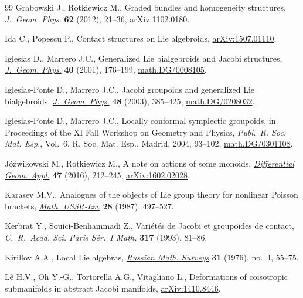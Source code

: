 \begin{thebibliography}{99}
Grabowski J., Rotkiewicz M., Graded bundles and homogeneity structures,
 \href{https://doi.org/10.1016/j.geomphys.2011.09.004}{\textit{J.~Geom. Phys.}} \textbf{62} (2012), 21--36, \href{https://arxiv.org/abs/1102.0180}{arXiv:1102.0180}.

Ida C., Popescu P., Contact structures on Lie algebroids, \href{https://arxiv.org/abs/1507.01110}{arXiv:1507.01110}.

Iglesias D., Marrero J.C., Generalized {L}ie bialgebroids and {J}acobi
 structures, \href{https://doi.org/10.1016/S0393-0440(01)00032-8}{\textit{J.~Geom. Phys.}} \textbf{40} (2001), 176--199,
 \href{https://arxiv.org/abs/math.DG/0008105}{math.DG/0008105}.

Iglesias-Ponte D., Marrero J.C., Jacobi groupoids and generalized {L}ie
 bialgebroids, \href{https://doi.org/10.1016/S0393-0440(03)00050-0}{\textit{J.~Geom. Phys.}} \textbf{48} (2003), 385--425,
 \href{https://arxiv.org/abs/math.DG/0208032}{math.DG/0208032}.

Iglesias-Ponte D., Marrero J.C., Locally conformal symplectic groupoids, in
 Proceedings of the {XI} {F}all {W}orkshop on {G}eometry and {P}hysics,
 \textit{Publ.~R. Soc. Mat. Esp.}, Vol.~6, R. Soc. Mat. Esp., Madrid, 2004,
 93--102, \href{https://arxiv.org/abs/math.DG/0301108}{math.DG/0301108}.

J\'o\'zwikowski M., Rotkiewicz M., A note on actions of some monoids,
 \href{https://doi.org/10.1016/j.difgeo.2016.04.003}{\textit{Differential Geom. Appl.}} \textbf{47} (2016), 212--245,
 \href{https://arxiv.org/abs/1602.02028}{arXiv:1602.02028}.

Karasev M.V., Analogues of the objects of Lie group theory for nonlinear
 {P}oisson brackets, \href{https://doi.org/10.1070/IM1987v028n03ABEH000895}{\textit{Math. USSR-Izv.}} \textbf{28} (1987), 497--527.

Kerbrat Y., Souici-Benhammadi Z., Vari\'et\'es de {J}acobi et groupo\"\i des de
 contact, \textit{C.~R.~Acad. Sci. Paris S\'er.~I Math.} \textbf{317} (1993),
 81--86.

Kirillov A.A., Local {L}ie algebras, \href{https://doi.org/10.1070/RM1976v031n04ABEH001556}{\textit{Russian Math. Surveys}} \textbf{31}
 (1976), no.~4, 55--75.

L\^{e} H.V., Oh Y.-G., Tortorella A.G., Vitagliano L., Deformations of
 coisotropic submanifolds in abstract {J}acobi manifolds, \href{https://arxiv.org/abs/1410.8446}{arXiv:1410.8446}.


\end{thebibliography}
